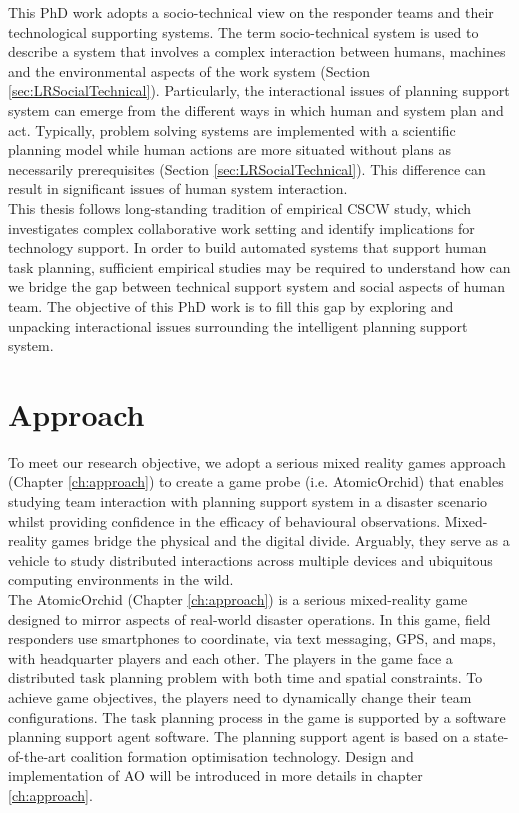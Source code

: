 This PhD work adopts a socio-technical view on the responder teams and their technological supporting systems. The term socio-technical system is used to describe a system that involves a complex interaction between humans, machines and the environmental aspects of the work system (Section \ref{sec:LRSocialTechnical}). Particularly, the interactional issues of planning support system can emerge from the different ways in which human and system plan and act. Typically, problem solving systems are implemented with a scientific planning model while human actions are more situated without plans as necessarily prerequisites (Section \ref{sec:LRSocialTechnical}). This difference can result in significant issues of human system interaction.\\

This thesis follows long-standing tradition of empirical \ac{CSCW} study, which investigates complex collaborative work setting and identify implications for technology support. In order to build automated systems that support human task planning, sufficient empirical studies may be required to understand how can we bridge the gap between technical support system and social aspects of human team.  The objective of this PhD work is to fill this gap by exploring and unpacking interactional issues surrounding the intelligent planning support system.\\

\section{Approach}\label{sec:custom}


To meet our research objective, we adopt a serious mixed reality games approach (Chapter \ref{ch:approach}) to create a game probe (i.e. AtomicOrchid) that enables studying team interaction with planning support system in a disaster scenario whilst providing confidence in the efficacy of behavioural observations. Mixed-reality games bridge the physical and the digital divide. Arguably, they serve as a vehicle to study distributed interactions across multiple devices and ubiquitous computing environments in the wild.\\

The AtomicOrchid (Chapter \ref{ch:approach}) is a serious mixed-reality game designed to mirror aspects of real-world disaster operations. In this game, field responders use smartphones to coordinate, via text messaging, GPS, and maps, with headquarter players and each other. The players in the game face a distributed task planning problem with both time and spatial constraints. To achieve game objectives, the players need to dynamically change their team configurations. The task planning process in the game is supported by a software planning support agent software. The planning support agent is based on a state-of-the-art coalition formation optimisation technology. Design and implementation of \acf{AO} will be introduced in more details in chapter \ref{ch:approach}.\\

